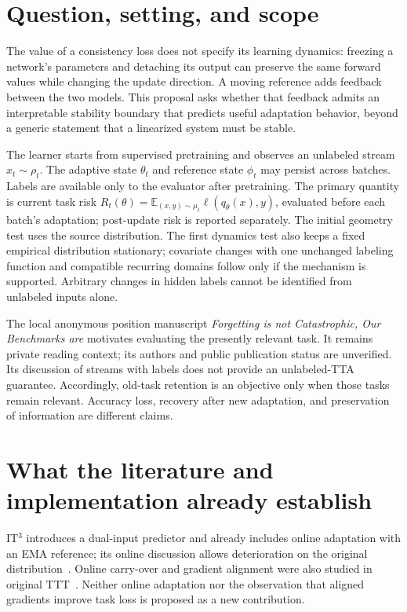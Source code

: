 \documentclass[11pt,a4paper]{article}
\newcommand{\E}{\mathbb{E}}
\begin{document}
\section{Question, setting, and scope}
The value of a consistency loss does not specify its learning dynamics:
freezing a network's parameters and detaching its output can preserve the
same forward values while changing the update direction. A moving reference
adds feedback between the two models. This proposal asks whether that
feedback admits an interpretable stability boundary that predicts useful
adaptation behavior, beyond a generic statement that a linearized system
must be stable.

The learner starts from supervised pretraining and observes an unlabeled
stream $x_t\sim\rho_t$. The adaptive state $\theta_t$ and reference state
$\phi_t$ may persist across batches. Labels are available only to the
evaluator after pretraining. The primary quantity is current task risk
$R_t(\theta)=\E_{(x,y)\sim\mu_t}\ell(q_\theta(x),y)$, evaluated before each
batch's adaptation; post-update risk is reported separately. The initial geometry test uses the source distribution. The first dynamics
test also keeps a fixed empirical distribution stationary; covariate changes with one
unchanged labeling function and compatible recurring domains follow only
if the mechanism is supported. Arbitrary changes in hidden
labels cannot be identified from unlabeled inputs alone.

The local anonymous position manuscript \emph{Forgetting is not Catastrophic,
Our Benchmarks are} motivates evaluating the presently relevant task.
It remains private reading context; its authors and public publication
status are unverified. Its discussion of streams with labels does not
provide an unlabeled-TTA guarantee. Accordingly, old-task retention is an
objective only when those tasks remain relevant. Accuracy loss, recovery
after new adaptation, and preservation of information are different claims.

\section{What the literature and implementation already establish}
IT$^3$ introduces a dual-input predictor and already includes online
adaptation with an EMA reference; its online discussion allows deterioration
on the original distribution~\cite{it3}. Online carry-over and gradient
alignment were also studied in original TTT~\cite{ttt}. Neither online
adaptation nor the observation that aligned gradients improve task loss
is proposed as a new contribution.
\end{document}
